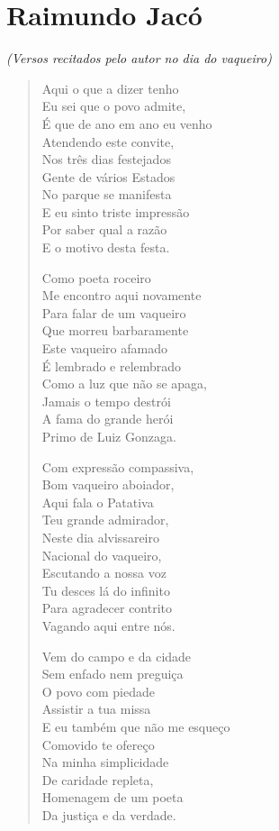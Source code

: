 \chapter{Raimundo Jacó}	

\hfill\emph{(Versos recitados pelo autor no dia do vaqueiro)}

\begin{verse}
Aqui o que a dizer tenho\\
Eu sei que o povo admite,\\
É que de ano em ano eu venho\\
Atendendo este convite,\\
Nos três dias festejados\\
Gente de vários Estados\\
No parque se manifesta\\
E eu sinto triste impressão\\
Por saber qual a razão\\
E o motivo desta festa.

Como poeta roceiro\\
Me encontro aqui novamente\\
Para falar de um vaqueiro\\
Que morreu barbaramente\\
Este vaqueiro afamado\\
É lembrado e relembrado\\
Como a luz que não se apaga,\\
Jamais o tempo destrói\\
A fama do grande herói\\
Primo de Luiz Gonzaga.

Com expressão compassiva,\\
Bom vaqueiro aboiador,\\
Aqui fala o Patativa\\
Teu grande admirador,\\
Neste dia alvissareiro\\
Nacional do vaqueiro,\\
Escutando a nossa voz\\
Tu desces lá do infinito\\
Para agradecer contrito\\
Vagando aqui entre nós.

Vem do campo e da cidade\\
Sem enfado nem preguiça\\
O povo com piedade\\
Assistir a tua missa\\
E eu também que não me esqueço\\
Comovido te ofereço\\
Na minha simplicidade\\
De caridade repleta,\\
Homenagem de um poeta\\
Da justiça e da verdade.


\end{verse}
